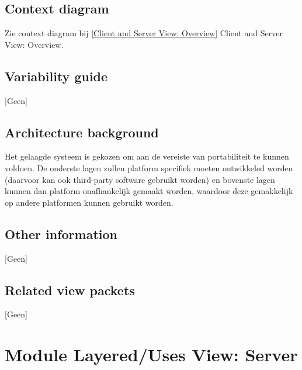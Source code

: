 \documentclass[a4paper,10pt]{article}
\begin{document}
\subsection{Context diagram}
Zie context diagram bij \ref{Client and Server View: Overview} Client and Server View: Overview.

\subsection{Variability guide}
[Geen]

\subsection{Architecture background}
Het gelaagde systeem is gekozen om aan de vereiste van portabiliteit te kunnen voldoen.  De onderste lagen zullen platform specifiek moeten ontwikkeled worden (daarvoor kan ook third-party software gebruikt worden) en bovenste lagen kunnen dan platform onafhankelijk gemaakt worden, waardoor deze gemakkelijk op andere platformen kunnen gebruikt worden.

\subsection{Other information}
[Geen]

\subsection{Related view packets}
[Geen]

\clearpage
\section{Module Layered/Uses View: Server}
\end{document}
